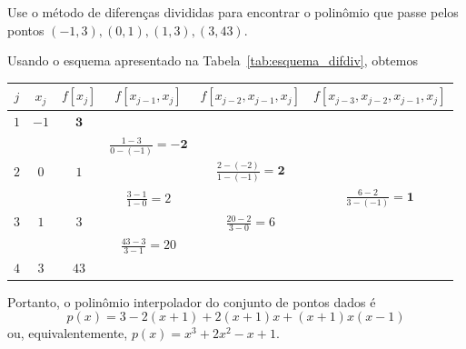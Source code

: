 \begin{ex}
Use o método de diferenças divididas para encontrar o polinômio que passe pelos pontos $(-1,3),(0,1),(1,3),(3,43)$.
\end{ex}
\begin{sol}
Usando o esquema apresentado na Tabela~\ref{tab:esquema_difdiv}, obtemos
\begin{center}
\begin{tabular}{c||c|cccc}\hline
 $j$ & $x_j$ & $f[x_j]$ & $f[x_{j-1},x_j]$ & $f[x_{j-2},x_{j-1},x_j]$ & $f[x_{j-3},x_{j-2},x_{j-1},x_j]$\\\hline
$1$ & $-1$ & $\pmb{3}$&&&\\
&&&$\displaystyle \frac{1-3}{0-(-1)}=\pmb{-2}$&&\\
$2$&$0$&$1$&&$\displaystyle \frac{2-(-2)}{1-(-1)}=\pmb{2}$&\\
&&&$\displaystyle \frac{3-1}{1-0}=2$&&$\displaystyle\frac{6-2}{3-(-1)}=\pmb{1}$\\
$3$&$1$&$3$&&$\displaystyle \frac{20-2}{3-0}=6$&\\
&&&$\displaystyle \frac{43-3}{3-1}=20$&&\\
$4$&$3$&$43$&&&\\\hline
\end{tabular}
\end{center}
Portanto, o polinômio interpolador do conjunto de pontos dados é
\begin{equation}
  p(x) = 3-2(x+1)+2(x+1)x+(x+1)x(x-1)
\end{equation}
ou, equivalentemente, $p(x) = x^3+2x^2-x+1$.


\end{sol}
